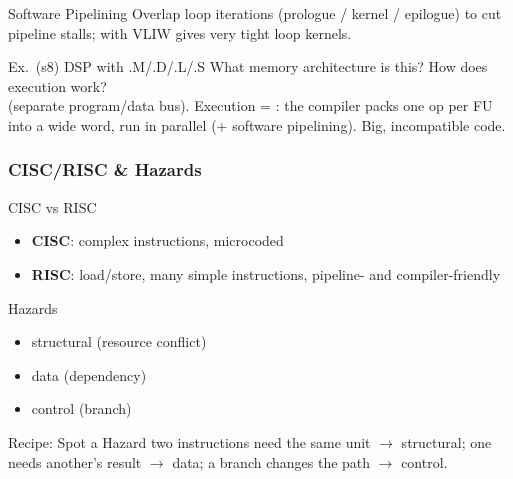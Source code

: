 \begin{concept}{Software Pipelining}
    Overlap loop iterations (prologue / kernel / epilogue) to cut pipeline stalls; with VLIW gives very tight loop kernels.
\end{concept}

\multend





\begin{example2}{Ex.\ (s8) DSP with .M/.D/.L/.S}
    What memory architecture is this? How does execution work?
     \\ 
     (separate program/data bus). Execution = : the compiler packs one op per FU into a wide word, run in parallel (+ software pipelining). Big, incompatible code.
\end{example2}

\subsubsection{CISC/RISC \& Hazards}


\begin{definition}{CISC vs RISC}
    \begin{itemize}
        \item \textbf{CISC}: complex instructions, microcoded
        \item \textbf{RISC}: load/store, many simple instructions, pipeline- and compiler-friendly
    \end{itemize}
\end{definition}

\begin{definition}{Hazards}
    \begin{itemize}
        \item structural (resource conflict)
        \item data (dependency)
        \item control (branch)
    \end{itemize}
\end{definition}

\multend

\begin{KR}{Recipe: Spot a Hazard}
    two instructions need the same unit $\to$ structural; one needs another's result $\to$ data; a branch changes the path $\to$ control.
\end{KR}

